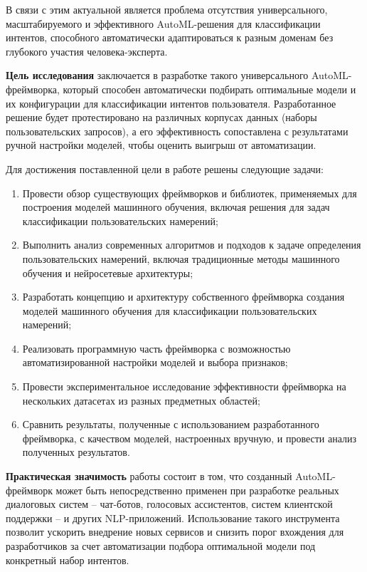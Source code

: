 \documentclass[14pt,a4paper,oneside,openany]{extbook}
\begin{document}
В связи с этим актуальной является проблема отсутствия универсального, масштабируемого и эффективного AutoML-решения для классификации интентов, способного автоматически адаптироваться к разным доменам без глубокого участия человека-эксперта.

\textbf{Цель исследования} заключается в разработке такого универсального AutoML-фреймворка, который способен автоматически подбирать оптимальные модели и их конфигурации для классификации интентов пользователя. Разработанное решение будет протестировано на различных корпусах данных (наборы пользовательских запросов), а его эффективность сопоставлена с результатами ручной настройки моделей, чтобы оценить выигрыш от автоматизации.

Для достижения поставленной цели в работе решены следующие задачи:
\begin{enumerate}
\item Провести обзор существующих фреймворков и библиотек, применяемых для построения моделей машинного обучения, включая решения для задач классификации пользовательских намерений;
\item Выполнить анализ современных алгоритмов и подходов к задаче определения пользовательских намерений, включая традиционные методы машинного обучения и нейросетевые архитектуры;
\item Разработать концепцию и архитектуру собственного фреймворка создания моделей машинного обучения для классификации пользовательских намерений;
\item Реализовать программную часть фреймворка с возможностью автоматизированной настройки моделей и выбора признаков;
\item Провести экспериментальное исследование эффективности фреймворка на нескольких датасетах из разных предметных областей;
\item Сравнить результаты, полученные с использованием разработанного фреймворка, с качеством моделей, настроенных вручную, и провести анализ полученных результатов.
\end{enumerate}

\textbf{Практическая значимость} работы состоит в том, что созданный AutoML-фреймворк может быть непосредственно применен при разработке реальных диалоговых систем – чат-ботов, голосовых ассистентов, систем клиентской поддержки – и других NLP-приложений. Использование такого инструмента позволит ускорить внедрение новых сервисов и снизить порог вхождения для разработчиков за счет автоматизации подбора оптимальной модели под конкретный набор интентов.
\end{document}
